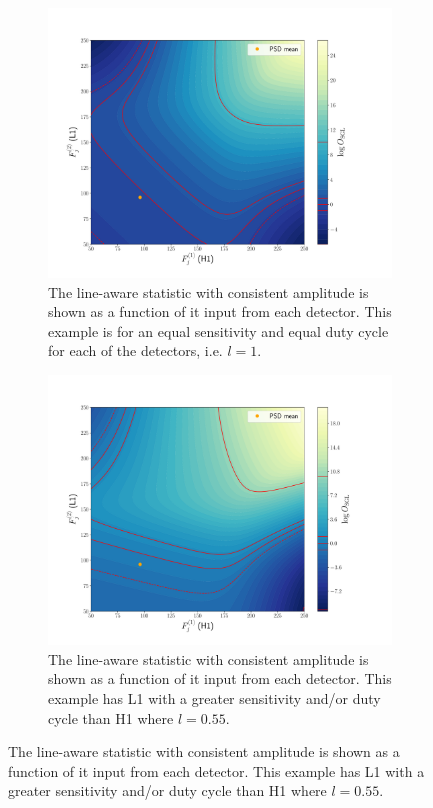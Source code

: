 \begin{figure}
\centering

\begin{subfigure}[h]{\linewidth}
\begin{minipage}{0.65\linewidth}
\includegraphics[width=0.9\linewidth]{C3_soap/lookup_3d_2.pdf}
\end{minipage}\hfill
\begin{minipage}{0.35\linewidth}
\caption{The line-aware statistic with consistent amplitude is shown as a function of it input from each detector. This example is for an equal sensitivity and equal duty cycle for each of the detectors, i.e. $l=1$.}
\label{soap:lineawareamp:plot:noline}
\end{minipage}
\end{subfigure}
\begin{subfigure}[h]{\linewidth}
\begin{minipage}{0.65\linewidth}
\includegraphics[width=0.9\columnwidth]{C3_soap/lookup_3d_1.pdf}
\end{minipage}\hfill
\begin{minipage}{0.35\linewidth}
\caption{The line-aware statistic with consistent amplitude is shown as a function of it input from each detector. This example has L1 with a greater sensitivity and/or duty cycle than H1 where $l=0.55$. }
\label{soap:lineawareamp:plot:linesmall}
\end{minipage}
\end{subfigure}


\end{figure}
